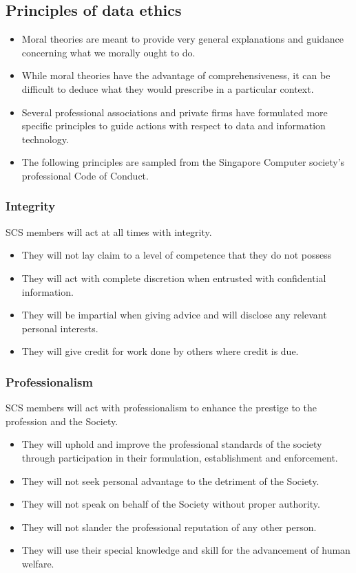 \documentclass[11pt]{article}
\begin{document}
\subsection{Principles of data ethics}
\label{sec:org7802589}
\begin{itemize}
\item Moral theories are meant to provide very general explanations and guidance concerning what we morally ought to do.
\item While moral theories have the advantage of comprehensiveness, it can be difficult to deduce what they would prescribe in a particular context.
\item Several professional associations and private firms have formulated more specific principles to guide actions with respect to data and information technology.
\item The following principles are sampled from the Singapore Computer society's professional Code of Conduct.
\end{itemize}

\subsubsection{Integrity}
\label{sec:org89f3634}
SCS members will act at all times with integrity.
\begin{itemize}
\item They will not lay claim to a level of competence that they do not possess
\item They will act with complete discretion when entrusted with confidential information.
\item They will be impartial when giving advice and will disclose any relevant personal interests.
\item They will give credit for work done by others where credit is due.
\end{itemize}

\subsubsection{Professionalism}
\label{sec:org17e609d}
SCS members will act with professionalism to enhance the prestige to the profession and the Society.
\begin{itemize}
\item They will uphold and improve the professional standards of the society through participation in their formulation, establishment and enforcement.
\item They will not seek personal advantage to the detriment of the Society.
\item They will not speak on behalf of the Society without proper authority.
\item They will not slander the professional reputation of any other person.
\item They will use their special knowledge and skill for the advancement of human welfare.
\end{itemize}
\end{document}
